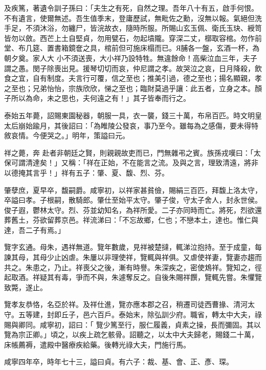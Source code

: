 \begin{pinyinscope}
 及疾篤，著遺令訓子孫曰：「夫生之有死，自然之理。吾年八十有五，啟手何恨。不有遺言，使爾無述。吾生值季末，登庸歷試，無毗佐之勳，沒無以報。氣絕但洗手足，不須沐浴，勿纏尸，皆浣故衣，隨時所服。所賜山玄玉佩、衛氏玉玦、綬笥皆勿以斂。西芒上土自堅貞，勿用甓石，勿起墳隴。穿深二丈，槨取容棺。勿作前堂、布几筵、置書箱鏡奩之具，棺前但可施床榻而已。Я脯各一盤，玄酒一杯，為朝夕奠。家人大
 小不須送喪，大小祥乃設特牲。無違餘命！高柴泣血三年，夫子謂之愚。閔子除喪出見。援琴切切而哀，仲尼謂之孝。故哭泣之哀，日月降殺，飲食之宜，自有制度。夫言行可覆，信之至也；推美引過，德之至也；揚名顯親，孝之至也；兄弟怡怡，宗族欣欣，悌之至也；臨財莫過乎讓：此五者，立身之本。顏子所以為命，未之思也，夫何遠之有！」其子皆奉而行之。



 泰始五年薨，詔賜東園秘器，朝服一具，衣一襲，錢三十萬，布帛百匹。時文明皇太后崩始踰月，其後詔曰：「為睢陵公發哀，事乃至今。雖每為之感傷，要未得特敘哀情。今便哭之。」明年，策謚曰元。



 祥之薨，奔
 赴者非朝廷之賢，則親親故吏而已，門無雜弔之賓。族孫戎嘆曰：「太保可謂清達矣！」又稱：「祥在正始，不在能言之流。及與之言，理致清遠，將非以德掩其言乎！」祥有五子：肇、夏、馥、烈、芬。



 肇孽庶，夏早卒，馥嗣爵。咸寧初，以祥家甚貧儉，賜絹三百匹，拜馥上洛太守，卒謚曰孝。子根嗣，散騎郎。肇仕至始平太守。肇子俊，守太子舍人，封永世侯。俊子遐，鬱林太守。烈、芬並幼知名，為祥所愛。二子亦同時而亡。將死，烈欲還葬舊土，芬欲留葬京邑。祥流涕曰：「不忘故鄉，仁也；不戀本土，達也。惟仁與達，吾二子有焉。」



 覽字玄通。母朱，遇祥無道。覽年數歲，見祥被楚撻，輒涕泣抱持。至于成童，每諫其母，其母少止凶虐。朱屢以非理使祥，覽輒與祥俱。又虐使祥妻，覽妻亦趨而共之。朱患之，乃止。祥喪父之後，漸有時譽。朱深疾之，密使鴆祥。覽知之，徑起取酒。祥疑其有毒，爭而不與，朱遽奪反之。自後朱賜祥饌，覽輒先嘗。朱懼覽致斃，遂止。



 覽孝友恭恪，名亞於祥。及祥仕進，覽亦應本郡之召，稍遷司徒西曹掾、清河太守。五等建，封即丘子，邑六百戶。泰始末，除弘訓少府。職省，轉太中大夫，祿賜與卿同。咸寧初，詔曰：「
 覽少篤至行，服仁履義，貞素之操，長而彌固。其以覽為宗正卿。」頃之，以疾上疏乞骸骨。詔聽之，以太中大夫歸老，賜錢二十萬，床帳薦褥，遣殿中醫療疾給藥。後轉光祿大夫，門施行馬。



 咸寧四年卒，時年七十三，謚曰貞。有六子：裁、基、會、正、彥、琛。




\end{pinyinscope}
